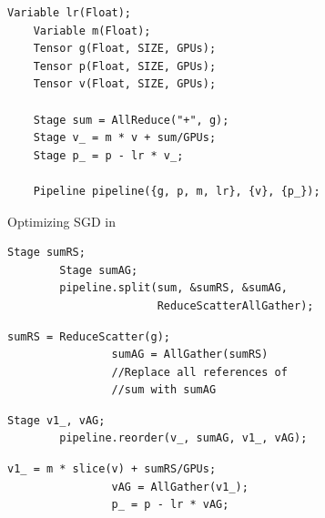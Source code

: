 \begin{figure}[t]
    \small
\begin{subfigure}{0.49\textwidth}
    \begin{lstlisting}[language=DSL]
    Variable lr(Float);
    Variable m(Float);
    Tensor g(Float, SIZE, GPUs);
    Tensor p(Float, SIZE, GPUs);
    Tensor v(Float, SIZE, GPUs);
    
    Stage sum = AllReduce("+", g);
    Stage v_ = m * v + sum/GPUs;
    Stage p_ = p - lr * v_;
    
    Pipeline pipeline({g, p, m, lr}, {v}, {p_});
\end{lstlisting}
\caption{Optimizing  SGD in \tool }
    \label{fig:traditional-sgd}
\end{subfigure}

\begin{subfigure}{0.45\textwidth}
\begin{lstlisting}[language=DSL]     
        Stage sumRS;
        Stage sumAG;
        pipeline.split(sum, &sumRS, &sumAG, 
                       ReduceScatterAllGather); 
\end{lstlisting}
\caption{}
\end{subfigure}
\begin{subfigure}{0.45\textwidth}
        \begin{lstlisting}[language=DSL]     
                sumRS = ReduceScatter(g); 
                sumAG = AllGather(sumRS)
                //Replace all references of 
                //sum with sumAG
        \end{lstlisting}
        \caption{}
\end{subfigure}

\begin{subfigure}{0.45\textwidth}
\begin{lstlisting}[language=DSL]     
        Stage v1_, vAG;
        pipeline.reorder(v_, sumAG, v1_, vAG); 
\end{lstlisting}
\caption{}
\end{subfigure}
\begin{subfigure}{0.45\textwidth}
        \begin{lstlisting}[language=DSL]     
                v1_ = m * slice(v) + sumRS/GPUs; 
                vAG = AllGather(v1_);
                p_ = p - lr * vAG;
        \end{lstlisting}
        \caption{}
\end{subfigure}


\end{figure}
